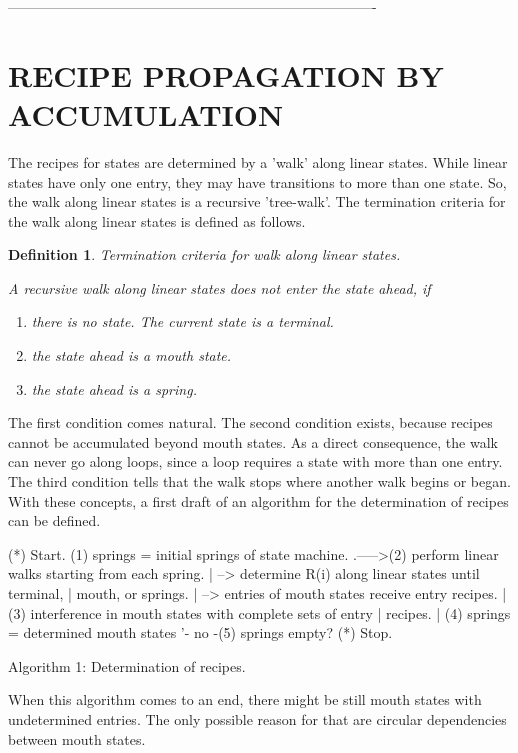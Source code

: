 \documentclass[12pt]{article}
\newtheorem{definition}{Definition}
\begin{document}
-------------------------------------------------------------------------------

\section{RECIPE PROPAGATION BY ACCUMULATION}

The recipes for states are determined by a 'walk' along linear states. While
linear states have only one entry, they may have transitions to more than one
state. So, the walk along linear states is a recursive 'tree-walk'. The
termination criteria for the walk along linear states is defined as follows.

\begin{definition}
Termination criteria for walk along linear states.

A recursive walk along linear states does not enter the
state ahead, if 

\begin{enumerate}
    \item there is no state. The current state is a terminal.
    \item the state ahead is a mouth state.
    \item the state ahead is a spring.
\end{enumerate}
\end{definition}

The first condition comes natural. The second condition exists, because recipes
cannot be accumulated beyond mouth states. As a direct consequence, the walk
can never go along loops, since a loop requires a state with more than one
entry. The third condition tells that the walk stops where another walk begins
or began.  With these concepts, a first draft of an algorithm for the
determination of recipes can be defined.

          (*) Start.
          (1) springs = initial springs of state machine.
   .----->(2) perform linear walks starting from each spring.
   |          --> determine R(i) along linear states until terminal,
   |              mouth, or springs.
   |          --> entries of mouth states receive entry recipes.
   |      (3) interference in mouth states with complete sets of entry
   |          recipes.
   |      (4) springs = determined mouth states
   '- no -(5) springs empty?
          (*) Stop.

        Algorithm 1: Determination of recipes.

When this algorithm comes to an end, there might be still mouth states with
undetermined entries. The only possible reason for that are circular
dependencies between mouth states. 
\end{document}
